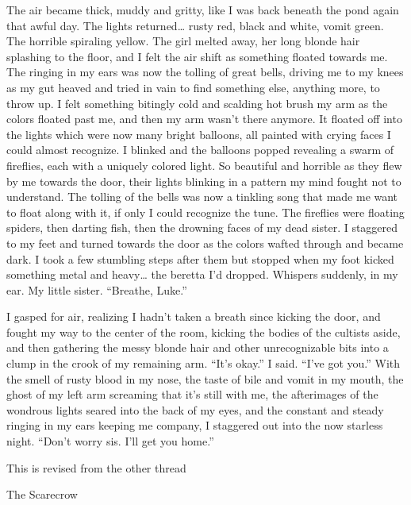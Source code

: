 The air became thick, muddy and gritty, like I was back beneath the
pond again that awful day. The lights returned{\ldots} rusty red,
black and white, vomit green. The horrible spiraling yellow. The
girl melted away, her long blonde hair splashing to the floor, and
I felt the air shift as something floated towards me. The ringing
in my ears was now the tolling of great bells, driving me to my
knees as my gut heaved and tried in vain to find something else,
anything more, to throw up. I felt something bitingly cold and
scalding hot brush my arm as the colors floated past me, and then
my arm wasn't there anymore. It floated off into the lights
which were now many bright balloons, all painted with crying faces
I could almost recognize. I blinked and the balloons popped
revealing a swarm of fireflies, each with a uniquely colored light.
So beautiful and horrible as they flew by me towards the door,
their lights blinking in a pattern my mind fought not to
understand. The tolling of the bells was now a tinkling song that
made me want to float along with it, if only I could recognize the
tune. The fireflies were floating spiders, then darting fish, then
the drowning faces of my dead sister. I staggered to my feet and
turned towards the door as the colors wafted through and became
dark. I took a few stumbling steps after them but stopped when my
foot kicked something metal and heavy{\ldots} the beretta I'd
dropped. Whispers suddenly, in my ear. My little sister.
``Breathe, Luke.''



I gasped for air, realizing I hadn't taken a breath since
kicking the door, and fought my way to the center of the room,
kicking the bodies of the cultists aside, and then gathering the
messy blonde hair and other unrecognizable bits into a clump in the
crook of my remaining arm. ``It's okay.'' I said.
``I've got you.'' With the smell of rusty blood in
my nose, the taste of bile and vomit in my mouth, the ghost of my
left arm screaming that it's still with me, the afterimages
of the wondrous lights seared into the back of my eyes, and the
constant and steady ringing in my ears keeping me company, I
staggered out into the now starless night. ``Don't worry
sis. I'll get you home.'' 
 





This is revised from the other thread



The Scarecrow

